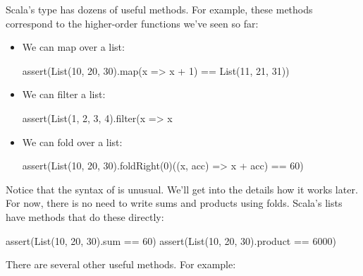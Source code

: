 \documentclass{book}
\begin{document}
Scala's  type has dozens of useful methods. For example,
these methods correspond to the higher-order functions we've seen so far:
%
\begin{itemize}

  \item We can map over a list:

  \begin{scalacode}
  assert(List(10, 20, 30).map(x => x + 1) == List(11, 21, 31))
  \end{scalacode}

  \item We can filter a list:

  \begin{scalacode}
  assert(List(1, 2, 3, 4).filter(x => x %
  \end{scalacode}

  \item We can fold over a list:

  \begin{scalacode}
  assert(List(10, 20, 30).foldRight(0)((x, acc) => x + acc) == 60)
  \end{scalacode}

\end{itemize}

Notice that the syntax of  is unusual. We'll get into the
details how it works later. For now, there is no need to write sums and products
using folds. Scala's lists have methods that do these directly:

\begin{scalacode}
assert(List(10, 20, 30).sum == 60)
assert(List(10, 20, 30).product == 6000)
\end{scalacode}

There are several other useful methods. For example:
\end{document}
